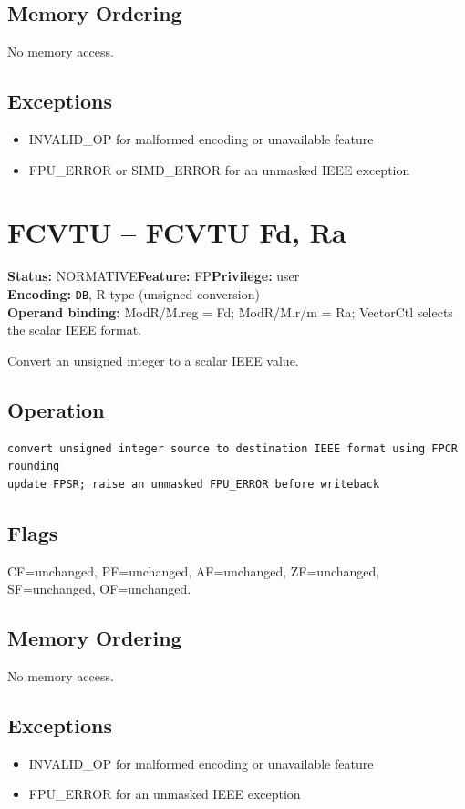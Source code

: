 \documentclass[10pt]{article}
\begin{document}
\subsection*{Memory Ordering}
No memory access.
\subsection*{Exceptions}
\begin{itemize}
\item INVALID\_OP for malformed encoding or unavailable feature
\item FPU\_ERROR or SIMD\_ERROR for an unmasked IEEE exception
\end{itemize}
\clearpage

\section{FCVTU -- FCVTU Fd, Ra}
\textbf{Status:} NORMATIVE\quad \textbf{Feature:} FP\quad \textbf{Privilege:} user\\
\textbf{Encoding:} \texttt{DB}, R-type (unsigned conversion)\\
\textbf{Operand binding:} ModR/M.reg = Fd; ModR/M.r/m = Ra; VectorCtl selects the scalar IEEE format.

Convert an unsigned integer to a scalar IEEE value.

\subsection*{Operation}
\begin{lstlisting}
convert unsigned integer source to destination IEEE format using FPCR rounding
update FPSR; raise an unmasked FPU_ERROR before writeback
\end{lstlisting}
\subsection*{Flags}
CF=unchanged, PF=unchanged, AF=unchanged, ZF=unchanged, SF=unchanged, OF=unchanged.
\subsection*{Memory Ordering}
No memory access.
\subsection*{Exceptions}
\begin{itemize}
\item INVALID\_OP for malformed encoding or unavailable feature
\item FPU\_ERROR for an unmasked IEEE exception
\end{itemize}
\clearpage
\end{document}
